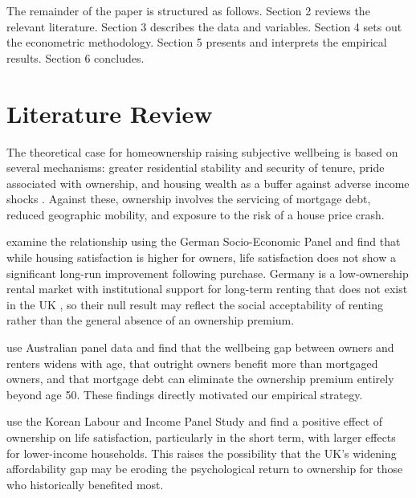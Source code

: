 \documentclass[12pt,a4paper]{article}
\begin{document}
The remainder of the paper is structured as follows. Section 2 reviews the
relevant literature. Section 3 describes the data and variables. Section 4
sets out the econometric methodology. Section 5 presents and interprets the empirical results. Section 6 concludes.
 
\section{Literature Review}
 
The theoretical case for homeownership raising subjective wellbeing is based on several mechanisms: greater residential stability and security of tenure, pride associated with ownership, and housing wealth as a buffer against adverse income shocks
\citep{Rohe2002}. Against these, ownership involves the servicing of mortgage debt,
reduced geographic mobility, and exposure to the risk of a house price crash.
 
\citet{Will2024} examine the relationship using the German Socio-Economic
Panel and find that while housing satisfaction is higher for owners, life
satisfaction does not show a significant long-run improvement following purchase.
Germany is a low-ownership rental market with institutional support for
long-term renting that does not exist in the UK \citep[p.~35]{Will2024},
so their null result may reflect the social acceptability of renting rather than the general absence of an ownership premium.
 
\citet{ViforJ2024} use Australian panel data and find that the wellbeing gap between owners and renters widens with age, that outright owners benefit more than mortgaged owners, and that mortgage debt can eliminate the ownership premium entirely beyond age 50. These findings directly motivated our empirical strategy.
 
\citet{Cho2023} use the Korean Labour and Income Panel Study and find a
positive effect of ownership on life satisfaction, particularly in the short
term, with larger effects for lower-income households. This raises the
possibility that the UK's widening affordability gap may be eroding the
psychological return to ownership for those who historically benefited most.
 
\end{document}
